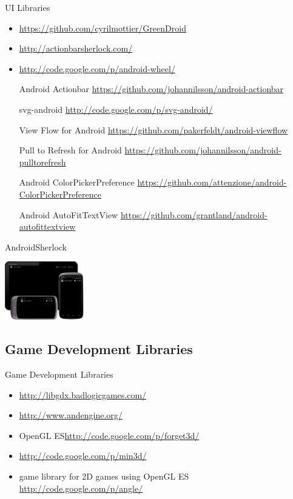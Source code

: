 \documentclass[aspectratio=169]{beamer}
\newcommand{\surl}[1] {{\tiny \url{#1}}}
\begin{document}
    \begin{frame}{UI Libraries}
      \begin{itemize}
       \item<1->[GreenDroid] \surl{https://github.com/cyrilmottier/GreenDroid}
       \item<2->[ActionBarSherlock] \surl{http://actionbarsherlock.com/} 
       \item<3->[Android Wheel] \surl{http://code.google.com/p/android-wheel/}
        \item[Android Actionbar] \surl{https://github.com/johannilsson/android-actionbar}
        \item[svg-android] \surl{http://code.google.com/p/svg-android/}
        \item[View Flow for Android] \surl{https://github.com/pakerfeldt/android-viewflow}
        \item[Pull to Refresh for Android] \surl{https://github.com/johannilsson/android-pulltorefresh}
        \item[Android ColorPickerPreference] \surl{https://github.com/attenzione/android-ColorPickerPreference}
        \item[Android AutoFitTextView] \surl{https://github.com/grantland/android-autofittextview}
       
      \end{itemize}
    \end{frame}

    \begin{frame}{AndroidSherlock}
      \begin{center}
      \includegraphics[height=1.0in]{androidsherlock.png}
      \end{center}
    \end{frame}

\subsection{Game Development Libraries}

    \begin{frame}{Game Development Libraries}
      \begin{itemize}
       \item<1->[libgdx] \surl{http://libgdx.badlogicgames.com/}
        \item<2->[AndEngine] \surl{http://www.andengine.org/}
        
       \item<3->[forget3D] OpenGL ES\surl{http://code.google.com/p/forget3d/}
        \item<4->[min3d] \surl{http://code.google.com/p/min3d/}
        \item<5->[Angle] game library for 2D games using OpenGL ES \surl{http://code.google.com/p/angle/}
      \end{itemize}
    \end{frame}
\end{document}
